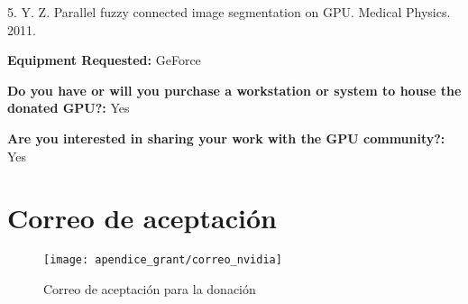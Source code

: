 5.	Y. Z. Parallel fuzzy connected image segmentation on GPU. Medical Physics. 2011.


\textbf{Equipment Requested:} GeForce

\textbf{Do you have or will you purchase a workstation or system to house the donated GPU?:} Yes

\textbf{Are you interested in sharing your work with the GPU community?:} Yes

\section{Correo de aceptación}

\begin{figure}[H]
    \centering
    \texttt{[image: apendice\_grant/correo\_nvidia]}
    \caption{Correo de aceptación para la donación}
    \label{fig:aceptaccion}
\end{figure}
